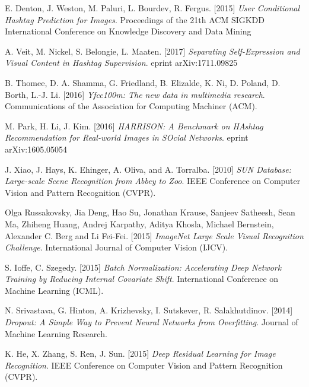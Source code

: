 \begin{thebibliography}{99}

	\bigskip
	
     E. Denton, J. Weston, M. Paluri, L. Bourdev, R. Fergus. [2015]
     \textit{User Conditional Hashtag Prediction for Images}.
     Proceedings of the 21th ACM SIGKDD International Conference 
     on Knowledge Discovery and Data Mining
     
      A. Veit, M. Nickel, S. Belongie, L. Maaten. [2017]
      \textit{Separating Self-Expression and Visual Content in Hashtag Supervision}.
      eprint arXiv:1711.09825
      
     B. Thomee, D. A. Shamma, G. Friedland, B. Elizalde, K. Ni,
     D. Poland, D. Borth, L.-J. Li. [2016]
     \textit{Yfcc100m: The new data in multimedia research}.
     Communications of the Association for Computing Machiner (ACM).
        
     M. Park, H. Li, J. Kim. [2016]
     \textit{HARRISON: A Benchmark on HAshtag Recommendation
     for Real-world Images in SOcial Networks}.
     eprint arXiv:1605.05054
     
	 J. Xiao, J. Hays, K. Ehinger, A. Oliva, and A. Torralba. [2010]
	 \textit{SUN Database: Large-scale Scene Recognition from Abbey to Zoo}.
	 IEEE Conference on Computer Vision and Pattern Recognition (CVPR).
     
     Olga Russakovsky, Jia Deng, Hao Su, Jonathan Krause, Sanjeev Satheesh, 
     Sean Ma, Zhiheng Huang, Andrej Karpathy, Aditya Khosla, Michael Bernstein, 
     Alexander C. Berg and Li Fei-Fei. [2015]
     \textit{ImageNet Large Scale Visual Recognition Challenge}. 
     International Journal of Computer Vision (IJCV).

	 S. Ioffe, C. Szegedy. [2015]
	 \textit{Batch Normalization: Accelerating Deep Network Training by 
	 Reducing Internal Covariate Shift}. 
	 International Conference on Machine Learning (ICML).
	 
	 N. Srivastava, G. Hinton, A. Krizhevsky, I. Sutskever, R. Salakhutdinov. [2014]
	 \textit{Dropout: A Simple Way to Prevent Neural Networks from Overfitting}.
	 Journal of Machine Learning Research.
	 
	 K. He, X. Zhang, S. Ren, J. Sun. [2015]
	 \textit{Deep Residual Learning for Image Recognition}.
	 IEEE Conference on Computer Vision and Pattern Recognition (CVPR).
	 

\end{thebibliography}
